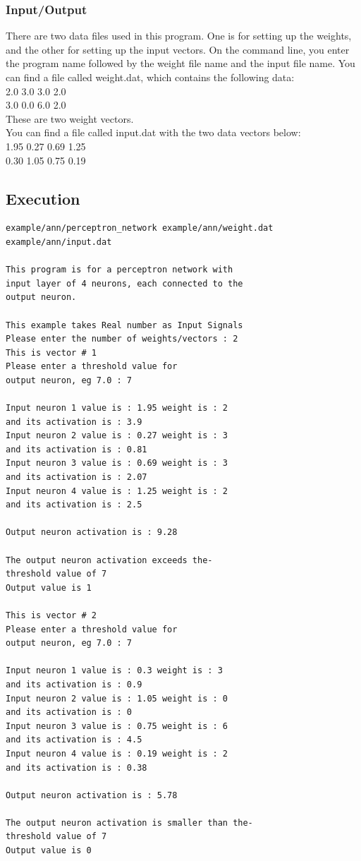 \subsubsection{Input/Output}
There are two data files used in this program. One is for setting up the weights, and the other for setting up the input vectors. On the command line, you enter the program name followed by the weight file name and the input file name. 
You can find a file called weight.dat, which contains the following data: \\
2.0 3.0 3.0 2.0 \\
3.0 0.0 6.0 2.0 \\
These are two weight vectors. \\
You can find a file called input.dat with the two data vectors below: \\
1.95 0.27 0.69 1.25 \\
0.30 1.05 0.75 0.19 \\

\subsection{Execution}
\begin{lstlisting}[caption={perceptron\_netwotk.cpp output}] %language=C++, 
example/ann/perceptron_network example/ann/weight.dat example/ann/input.dat

This program is for a perceptron network with  
input layer of 4 neurons, each connected to the 
output neuron.

This example takes Real number as Input Signals
Please enter the number of weights/vectors : 2
This is vector # 1
Please enter a threshold value for 
output neuron, eg 7.0 : 7

Input neuron 1 value is : 1.95 weight is : 2  
and its activation is : 3.9
Input neuron 2 value is : 0.27 weight is : 3  
and its activation is : 0.81
Input neuron 3 value is : 0.69 weight is : 3  
and its activation is : 2.07
Input neuron 4 value is : 1.25 weight is : 2  
and its activation is : 2.5

Output neuron activation is : 9.28

The output neuron activation exceeds the-
threshold value of 7
Output value is 1

This is vector # 2
Please enter a threshold value for 
output neuron, eg 7.0 : 7

Input neuron 1 value is : 0.3 weight is : 3  
and its activation is : 0.9
Input neuron 2 value is : 1.05 weight is : 0  
and its activation is : 0
Input neuron 3 value is : 0.75 weight is : 6  
and its activation is : 4.5
Input neuron 4 value is : 0.19 weight is : 2  
and its activation is : 0.38

Output neuron activation is : 5.78

The output neuron activation is smaller than the- 
threshold value of 7
Output value is 0
\end{lstlisting}


